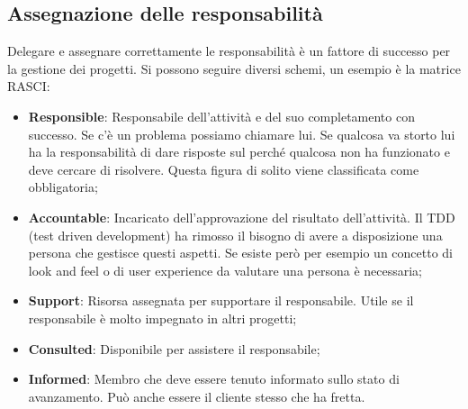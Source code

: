 \subsection{Assegnazione delle responsabilità}
Delegare e assegnare correttamente le responsabilità è un fattore di successo per la gestione dei progetti.
Si possono seguire diversi schemi, un esempio è la matrice RASCI:
\begin{itemize}
	\item \textbf{Responsible}: Responsabile dell’attività e del suo completamento con successo. Se c'è un problema possiamo chiamare lui. Se qualcosa va storto lui ha la responsabilità di dare risposte sul perché qualcosa non ha funzionato e deve cercare di risolvere. Questa figura di solito viene classificata come obbligatoria;
	\item \textbf{Accountable}: Incaricato dell’approvazione del risultato dell’attività. Il TDD (test driven development) ha rimosso il bisogno di avere a disposizione una persona che gestisce questi aspetti. Se esiste però per esempio un concetto di look and feel o di user experience da valutare una persona è necessaria;
	\item \textbf{Support}: Risorsa assegnata per supportare il responsabile. Utile se il responsabile è molto impegnato in altri progetti;
	\item \textbf{Consulted}: Disponibile per assistere il responsabile;
	\item \textbf{Informed}: Membro che deve essere tenuto informato sullo stato di avanzamento. Può anche essere il cliente stesso che ha fretta.
\end{itemize}

